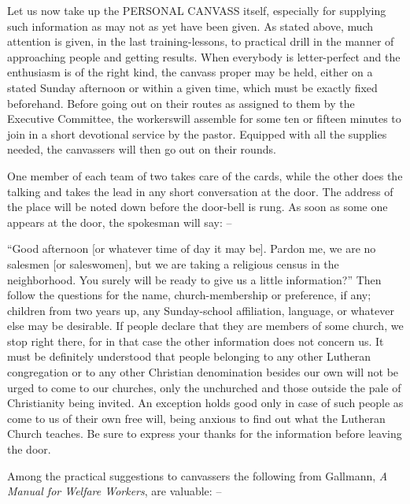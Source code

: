 \documentclass[
]{book}
\begin{document}
Let us now take up the PERSONAL CANVASS itself, especially for supplying such information as may not as yet have been given. As stated above, much attention is given, in the last training-lessons, to practical drill in the manner of approaching people and getting results. When everybody is letter-perfect and the enthusiasm is of the right kind, the canvass proper may be held, either on a stated Sunday afternoon or within a given time, which must be exactly fixed beforehand. Before going out on their routes as assigned to them by the Executive Committee, the workerswill assemble for some ten or fifteen minutes to join in a short devotional service by the pastor. Equipped with all the supplies needed, the canvassers will then go out on their rounds.

One member of each team of two takes care of the cards, while the other does the talking and takes the lead in any short conversation at the door. The address of the place will be noted down before the door-bell is rung. As soon as some one appears at the door, the spokesman will say: --

``Good afternoon {[}or whatever time of day it may be{]}. Pardon me, we are no salesmen {[}or saleswomen{]}, but we are taking a religious census in the neighborhood. You surely will be ready to give us a little information?'' Then follow the questions for the name, church-membership or preference, if any; children from two years up, any Sunday-school affiliation, language, or whatever else may be desirable. If people declare that they are members of some church, we stop right there, for in that case the other information does not concern us. It must be definitely understood that people belonging to any other Lutheran congregation or to any other Christian denomination besides our own will not be urged to come to our churches, only the unchurched and those outside the pale of Christianity being invited. An exception holds good only in case of such people as come to us of their own free will, being anxious to find out what the Lutheran Church teaches. Be sure to express your thanks for the information before leaving the door.

Among the practical suggestions to canvassers the following from Gallmann, \emph{A Manual for Welfare Workers}, are valuable: --
\end{document}
